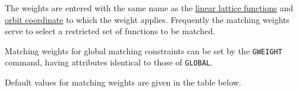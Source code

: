 The weights are entered with the same name as the
\hyperref[subsec:tables-linear]{linear lattice functions} and
\hyperref[subsec:tables-canon]{orbit coordinate} 
to which the weight applies.
Frequently the matching weights serve to select a restricted
set of functions to be matched.

Matching weights for global matching constraints can be set by the 
\texttt{GWEIGHT} command, having attributes identical to those of
\texttt{GLOBAL}.



Default values for matching weights are given in the table below.

